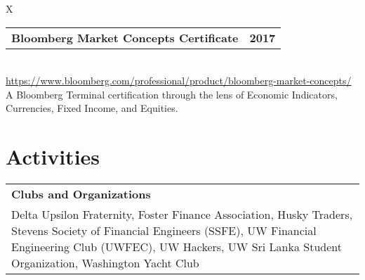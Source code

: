 \documentclass[10pt]{article}
\newcommand{\tabularxwidth}{\textwidth}
\begin{document}
            \begin{minipage}{\tabularxwidth}
            \begin{tabularx}{\tabularxwidth}{X}
                {
                    \begin{tabularx}{\tabularxwidth}{@{}X r}
                        \textbf{Bloomberg Market Concepts Certificate} &
                        \textbf{
        2017} \\
                    \end{tabularx}
                } \\
                    \url{https://www.bloomberg.com/professional/product/bloomberg-market-concepts/} \\
                
                    
    A Bloomberg Terminal certification through the lens of Economic Indicators, Currencies, Fixed Income, and Equities. \\
                
            \end{tabularx}

            
                \vspace{.5em}
            

            

            \end{minipage}
        
    




    
        \section{Activities}

    
        \begin{tabularx}{\tabularxwidth}{X}
            \textbf{Clubs and Organizations} \\
            
    
            Delta Upsilon Fraternity, 
            Foster Finance Association, 
            Husky Traders, 
            Stevens Society of Financial Engineers (SSFE), 
            UW Financial Engineering Club (UWFEC), 
            UW Hackers, 
            UW Sri Lanka Student Organization, 
            Washington Yacht Club \\
        \end{tabularx}
\end{document}
